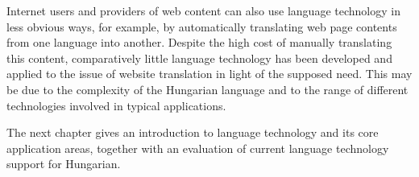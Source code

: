 \begin{multicols}{2}
  Internet users and providers of web content can also use language technology in less obvious ways, for example, by automatically translating web page contents from one language into another. Despite the high cost of manually translating this content, comparatively little language technology has been developed and applied to the issue of website translation in light of the supposed need. This may be due to the complexity of the Hungarian language and to the range of different technologies involved in typical applications.  

  The next chapter gives an introduction to language technology and its core application areas, together with an evaluation of current language technology support for Hungarian.
  \end{multicols}

  \clearpage



